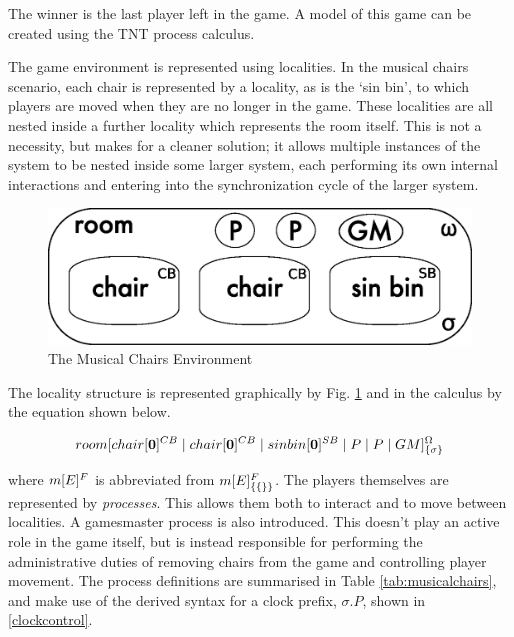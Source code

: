 \noindent The winner is the last player left in the game.  A model of
this game can be created using the TNT process calculus.

The game environment is represented using localities.  In the musical
chairs scenario, each chair is represented by a locality, as is the `sin
bin', to which players are moved when they are no longer in the game.
These localities are all nested inside a further locality which
represents the room itself.  This is not a necessity, but makes for a
cleaner solution; it allows multiple instances of the system to be
nested inside some larger system, each performing its own internal
interactions and entering into the synchronization cycle of the larger
system.

\begin{figure}  
  \centering
  \includegraphics[scale=0.5]{gameenvbw}
  \caption{The Musical Chairs Environment}
  \label{fig:gameenv}
\end{figure}

The locality structure is represented graphically by Fig. \ref{fig:gameenv}
and in the calculus by the equation shown below.

\begin{equation}
{room}[ {chair}[ \textbf{0} ]^{CB} \;|\; {chair}[ \textbf{0} ]^{CB}
\;|\; {sin bin}[ \textbf{0} ]^{SB} \;|\; P \;|\; P \;|\; GM ]^{\Omega}_{\{\sigma\}}
\end{equation}

\noindent where ${m}[ E ]^{F}$ is abbreviated from
${m}[ E ]^{F}_{\{\{\}\}}$.  The players themselves are represented by
\emph{processes}.  This allows them both to interact and to move between
localities.  A gamesmaster process is also introduced.  This doesn't
play an active role in the game itself, but is instead responsible for
performing the administrative duties of removing chairs from the game
and controlling player movement.  The process definitions are summarised
in Table \ref{tab:musicalchairs}, and make use of the derived syntax for
a clock prefix, $\sigma.P$, shown in \ref{clockcontrol}.

